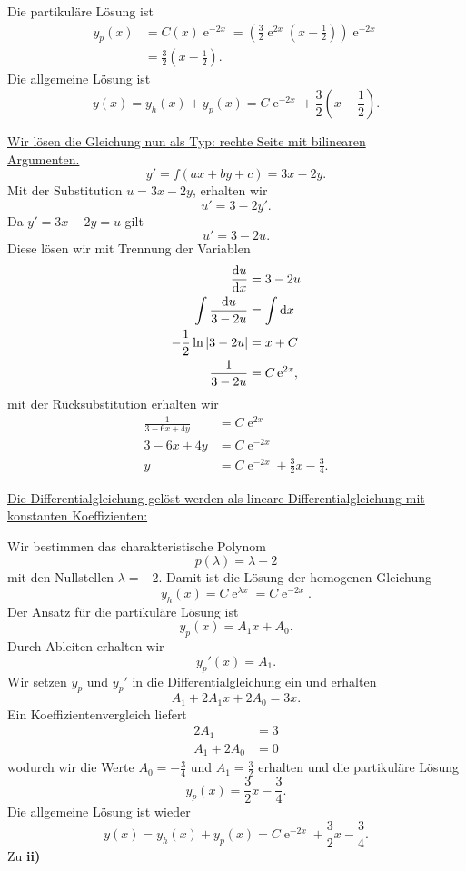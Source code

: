 {\begin{itemize}
Die partikuläre Lösung ist
\begin{align*}
y_p(x) &= C(x) \operatorname{e}^{-2x} = \left( \frac{3}{2} \operatorname{e}^{2x} (x-\frac{1}{2})\right) \operatorname{e}^{-2x}\\
&=\frac{3}{2} (x-\frac{1}{2}).
\end{align*}
Die allgemeine Lösung ist
$$
y(x) = y_h(x) + y_p(x) = C \operatorname{e}^{-2x} + \frac{3}{2} (x-\frac{1}{2}).
$$

\underline{Wir lösen die Gleichung nun als Typ: rechte Seite mit bilinearen}\\
\underline{Argumenten.}
$$
y'=f(ax+by+c)=3x-2y.
$$
Mit der Substitution $u=3x-2y$, erhalten wir
$$
u'= 3 -2y'.
$$
Da $y'=3x-2y=u$ gilt 
$$
u'= 3-2u.
$$
Diese lösen wir mit Trennung der Variablen
\begin{align*}
\frac{\mathrm{d} u}{\mathrm{d} x} &= 3-2u\\
 \int \frac{\mathrm{d} u}{3-2u} &= \int \mathrm{d} x\\
 -\frac{1}{2} \ln |3-2u| &= x + C\\
 \frac{1}{3-2u} &= C\operatorname{e}^{2x},
\end{align*}
mit der Rücksubstitution erhalten wir
\begin{align*}
\frac{1}{3-6x+4y} &= C \operatorname{e}^{2x}\\
3-6x+4y &= C \operatorname{e}^{-2x}\\
y &= C\operatorname{e}^{-2x} +\frac{3}{2}x - \frac{3}{4}.
\end{align*}

\newpage
\underline{Die Differentialgleichung gelöst werden als lineare Differentialgleichung mit}\\
\underline{ konstanten Koeffizienten:}

Wir bestimmen das charakteristische Polynom
$$
p(\lambda) = \lambda + 2
$$
mit den Nullstellen $\lambda = -2$. Damit ist die Lösung der homogenen Gleichung 
$$
y_h(x) = C\operatorname{e}^{\lambda x} = C \operatorname{e}^{-2x}.
$$
Der Ansatz für die partikuläre Lösung ist
$$
y_p(x) = A_1x + A_0.
$$
Durch Ableiten erhalten wir
$$
y_p'(x) = A_1.
$$
Wir setzen $y_p$ und $y_p'$ in die Differentialgleichung ein und erhalten
$$
A_1+2A_1x+2A_0 = 3x.
$$
Ein Koeffizientenvergleich liefert
\begin{align*}
2A_1 &= 3\\
A_1+2A_0 &= 0
\end{align*}
wodurch wir die Werte $A_0 = -\frac{3}{4}$ und $A_1 = \frac{3}{2}$ erhalten und 
die partikuläre Lösung
$$
y_p(x) = \frac{3}{2}x-\frac{3}{4}.
$$
Die allgemeine Lösung ist wieder
$$
y(x) = y_h(x)+y_p(x) = C\operatorname{e}^{-2x} + \frac{3}{2}x-\frac{3}{4}.
$$
\noindent Zu \textbf{ii)}


\end{itemize}}

